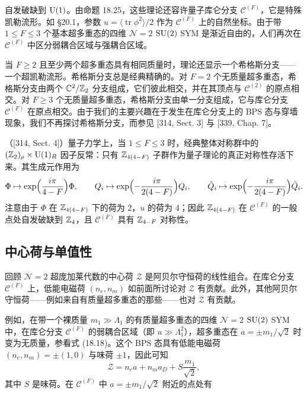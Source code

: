 自发破缺到 $\operatorname{U}(1)$。由命题 18.25，这些理论还容许量子库仑分支 $\mathcal{C}^{(F)}$，它是特殊凯勒流形。如 §20.1，参数 $u=\langle\operatorname{tr}\phi^2\rangle/2$ 作为 $\mathcal{C}^{(F)}$ 上的自然坐标。由于带 $1\le F\le3$ 个基本超多重态的四维 $\mathcal{N}=2$ $\operatorname{SU}(2)$ SYM 是渐近自由的，人们再次在 $\mathcal{C}^{(F)}$ 中区分弱耦合区域与强耦合区域。

当 $F\ge2$ 且至少两个超多重态具有相同质量时，理论还显示一个希格斯分支——一个超凯勒流形。希格斯分支总是经典精确的。对 $F=2$ 个无质量超多重态，希格斯分支由两个 $\mathbb{C}^2/\mathbb{Z}_2$ 分支组成，它们彼此相交，并在其顶点与 $\mathcal{C}^{(2)}$ 的原点相交。对 $F\ge3$ 个无质量超多重态，希格斯分支由单一分支组成，它与库仑分支 $\mathcal{C}^{(F)}$ 在原点相交。由于我们的主要兴趣在于发生在库仑分支上的 BPS 态与穿墙现象，我们不再探讨希格斯分支，而参见 [314, Sect. 3] 与 [339, Chap. 7]。

\begin{proposition}[20.21]
（[314, Sect. 4]）量子力学上，当 $1\le F\le3$ 时，经典整体对称群中的 $(\mathbb{Z}_2)_\rho\times\operatorname{U}(1)_R$ 因子反常：只有 $\mathbb{Z}_{4(4-F)}$ 子群作为量子理论的真正对称性存活下来。其生成元作用为
\[
\Phi\mapsto\exp\Bigl(\frac{i\pi}{4-F}\Bigr)\Phi,\qquad
Q_i\mapsto\exp\Bigl(-\frac{i\pi}{2(4-F)}\Bigr)Q_i,\qquad
\tilde Q_i\mapsto\exp\Bigl(-\frac{i\pi}{2(4-F)}\Bigr)\tilde Q_i.
\]
注意由于 $\Phi$ 在 $\mathbb{Z}_{4(4-F)}$ 下的荷为 $2$，$u$ 的荷为 $4$；因此 $\mathbb{Z}_{4(4-F)}$ 在 $\mathcal{C}^{(F)}$ 的一般点处自发破缺到 $\mathbb{Z}_4$，且 $\mathcal{C}^{(F)}$ 具有 $\mathbb{Z}_{4-F}$ 对称性。
\end{proposition}

\subsection{中心荷与单值性}

回顾 $\mathcal{N}=2$ 超庞加莱代数的中心荷 $\mathcal{Z}$ 是阿贝尔守恒荷的线性组合。在库仑分支 $\mathcal{C}^{(F)}$ 上，低能电磁荷 $(n_e,n_m)$ 如前面所讨论对 $\mathcal{Z}$ 有贡献。此外，其他阿贝尔守恒荷——例如来自有质量超多重态的那些——也对 $\mathcal{Z}$ 有贡献。

例如，在带一个裸质量 $m_1\gg\Lambda_1$ 的有质量超多重态的四维 $\mathcal{N}=2$ $\operatorname{SU}(2)$ SYM 中，在库仑分支 $\mathcal{C}^{(F)}$ 的弱耦合区域（即 $u\gg\Lambda_1^2$），超多重态在 $a=\pm m_1/\sqrt2$ 时变为无质量，参看式 (18.18)。这个 BPS 态具有低能电磁荷 $(n_e,n_m)=\pm(1,0)$ 与味荷 $\pm1$，因此可知
\begin{equation}
\mathcal{Z}=n_ea+n_ma_D+S\frac{m_1}{\sqrt2},
\tag{20.11}
\end{equation}
其中 $S$ 是味荷。在 $\mathcal{C}^{(F)}$ 中 $a=\pm m_1/\sqrt2$ 附近的点处有

